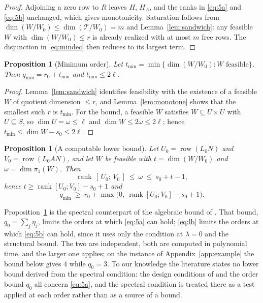 \documentclass[journal]{IEEEtran}
\theoremstyle{plainn}
\newtheorem{prop}[thm]{Proposition}
\theoremstyle{remark}
\begin{document}
\begin{proof}
Adjoining a zero row to $R$ leaves $H$, $H_A$, and the ranks in \eqref{eq:5a} and
\eqref{eq:5b} unchanged, which gives monotonicity. Saturation follows from
$\dim(W/W_0)\le\dim(\mathcal T/W_0)=m$ and Lemma~\ref{lem:sandwich}: any feasible $W$ with
$\dim(W/W_0)\le r$ is already realized with at most $m$ free rows. The disjunction in
\eqref{eq:mindec} then reduces to its largest term.
\end{proof}

\begin{prop}[Minimum order]\label{prop:minorder}
Let $t_{\min}=\min\{\dim(W/W_0):W \text{ feasible}\}$. Then
$q_{\min}=r_0+t_{\min}$ and $t_{\min}\le2\ell$.
\end{prop}

\begin{proof}
Lemma~\ref{lem:sandwich} identifies feasibility with the existence of a feasible $W$ of
quotient dimension $\le r$, and Lemma~\ref{lem:monotone} shows that the smallest such $r$ is
$t_{\min}$. For the bound, a feasible $W$ satisfies $W\subseteq U\times U$ with
$U\subseteq S$, so $\dim U=\omega\le\ell$ and $\dim W\le2\omega\le2\ell$; hence
$t_{\min}\le\dim W-s_0\le2\ell$.
\end{proof}

\begin{prop}[A computable lower bound]\label{prop:lowerbound}
Let $U_0=\operatorname{row}(L_0N)$ and $V_0=\operatorname{row}(L_0AN)$, and let $W$ be feasible with
$t=\dim(W/W_0)$ and $\omega=\dim\pi_1(W)$. Then
\begin{equation}\label{eq:lb}
\operatorname{rank}\,[\,U_0;\,V_0\,]\ \le\ \omega\ \le\ s_0+t-1,
\end{equation}
hence $t\ge\operatorname{rank}[U_0;V_0]-s_0+1$ and
\begin{equation}\label{eq:qmin-lb}
q_{\min}\ \ge\ r_0+\max\bigl(0,\ \operatorname{rank}[U_0;V_0]-s_0+1\bigr).
\end{equation}
\end{prop}

Proposition~\ref{prop:lowerbound} is the spectral counterpart of the algebraic bound of
\cite{fer26a,fer26b}. That bound, $q_0=\sum_j\eta_j$, limits the orders at which \eqref{eq:5a} can
hold; \eqref{eq:lb} limits the orders at which \eqref{eq:5b} can hold, since it uses only the
condition at $\lambda=0$ and the structural bound. The two are independent, both are computed in
polynomial time, and the larger one applies; on the instance of Appendix~\ref{app:example} the bound
below gives $4$ while $q_0=3$. To our knowledge the literature states no lower bound derived from the
spectral condition: the design conditions of \cite{fer10,dar25,fer26a,fer26b} and the order bound
$q_0$ all concern \eqref{eq:5a}, and the spectral condition is treated there as a test applied at each
order rather than as a source of a bound.
\end{document}
